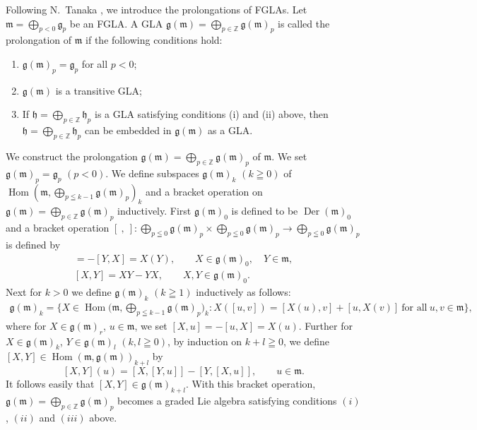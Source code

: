 \documentclass[11pt]{article}
\numberwithin{equation}{section}
\numberwithin{theorem}{section}
\numberwithin{proposition}{section}
\numberwithin{lemma}{section}
\numberwithin{corollary}{section}
\numberwithin{definition}{section}
\numberwithin{example}{section}
\numberwithin{remark}{section}
\numberwithin{note}{section}
\newcommand{\Hom}{\operatorname{Hom}}
\newcommand{\Der}{\operatorname{Der}}
\begin{document}
Following N.~Tanaka \cite{tan70:1}, we introduce the prolongations of FGLAs.
Let $\mathfrak m=\bigoplus\limits_{p<0}\mathfrak g_p$ be an FGLA.
A GLA
$\mathfrak g(\mathfrak m)
=\bigoplus\limits_{p\in\mathbb Z}\mathfrak g(\mathfrak m)_p$ is called the prolongation of $\mathfrak m$ if the following conditions hold:
\begin{enumerate}\itemsep=0pt
\renewcommand{\labelenumi}{$(\roman{enumi})$}
\item $\mathfrak g(\mathfrak m)_p=\mathfrak g_p$ for all $p<0$;
\item $\mathfrak g(\mathfrak m)$ is a transitive GLA;
\item If $\mathfrak h=\bigoplus\limits_{p\in\mathbb Z}\mathfrak h_p$ is a
GLA satisfying conditions (i) and (ii) above, then
$\mathfrak h=\bigoplus\limits_{p\in\mathbb Z}\mathfrak h_p$ can be embedded in
$\mathfrak g(\mathfrak m)$ as a GLA.
\end{enumerate}
We construct the prolongation $\mathfrak g(\mathfrak m)
=\bigoplus\limits_{p\in\mathbb Z}\mathfrak g(\mathfrak m)_p$ of $\mathfrak m$.
We set $\mathfrak g(\mathfrak m)_p=\mathfrak g_p$ $(p<0)$.
We def\/ine subspaces $\mathfrak g(\mathfrak m)_k$ $(k\geqq0)$ of
$\Hom(\mathfrak m,\bigoplus\limits_{p\leqq k-1}\mathfrak g(\mathfrak m)_p)_k$
and a bracket operation on $\mathfrak g(\mathfrak m)
=\bigoplus\limits_{p\in\mathbb Z}\mathfrak g(\mathfrak m)_p$ inductively.
First $\mathfrak g(\mathfrak m)_0$ is def\/ined to be $\Der(\mathfrak m)_0$ and a bracket operation $[\ ,\ ]:\bigoplus\limits_{p\leqq 0}\mathfrak g(\mathfrak m)_p\times \bigoplus\limits_{p\leqq 0}\mathfrak g(\mathfrak m)_p\to
\bigoplus\limits_{p\leqq 0}\mathfrak g(\mathfrak m)_p$ is def\/ined by
\begin{gather*}
[X,Y]=-[Y,X]=X(Y),\qquad  X\in\mathfrak g(\mathfrak m)_0, \quad Y\in\mathfrak m,\\
[X,Y]=XY-YX, \qquad  X,Y\in\mathfrak g(\mathfrak m)_0 .
\end{gather*}
Next for $k>0$ we def\/ine $\mathfrak g(\mathfrak m)_k$ $(k\geqq1)$ inductively
as follows:
\begin{gather*}
\mathfrak g(\mathfrak m)_k
=\Big\{ X\in\Hom\Big(\mathfrak m,\!\bigoplus_{p\leqq k-1}\mathfrak g(\mathfrak m)_p\Big)_k\!:
X([u,v])=[X(u),v]+[u,X(v)]\  \text{for all}\ u,v\in\mathfrak m\Big\},
\end{gather*}
where for $X\in\mathfrak g(\mathfrak m)_r$, $u\in\mathfrak m$,
we set $[X,u]=-[u,X]=X(u)$. Further for $X\in\mathfrak g(\mathfrak m)_k$,
$Y\in\mathfrak g(\mathfrak m)_l$ $(k,l\geqq0)$, by induction on $k+l\geqq0$,
we def\/ine $[X,Y]\in\Hom(\mathfrak m,\mathfrak g(\mathfrak m))_{k+l}$ by
\[
[X,Y](u)=[X,[Y,u]]-[Y,[X,u]],\qquad  u\in \mathfrak m .
\]
It follows easily that $[X,Y]\in \mathfrak g(\mathfrak m)_{k+l}$.
With this bracket operation, $\mathfrak g(\mathfrak m)
=\bigoplus\limits_{p\in\mathbb Z}\mathfrak g(\mathfrak m)_p$ becomes a graded
Lie algebra satisfying conditions $(i)$, $(ii)$ and $(iii)$ above.
\end{document}
